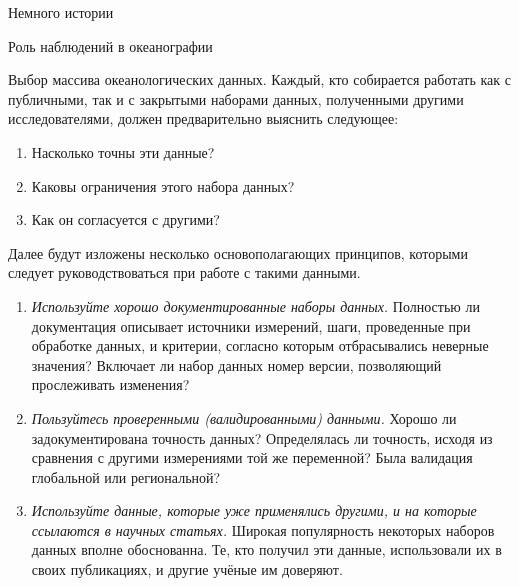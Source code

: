 \begin{chapter}{Немного истории}
\begin{section}{Роль наблюдений в океанографии}
\begin{paragraph}{Выбор массива океанологических данных.}
Каждый, кто собирается работать как с публичными, так и с закрытыми 
наборами данных, полученными другими исследователями, должен предварительно
выяснить следующее:
\begin{enumerate}
   \item Насколько точны эти данные?
   \item Каковы ограничения этого набора данных?
   \item Как он согласуется с другими?
\end{enumerate}
%

Далее будут изложены несколько основополагающих принципов, которыми следует
руководствоваться при работе с такими данными.
%

\begin{enumerate}
\item
\emph{Используйте хорошо документированные наборы данных.} Полностью ли
документация описывает источники измерений, шаги, проведенные при
обработке данных, и критерии, согласно которым отбрасывались неверные
значения? Включает ли набор данных номер версии, позволяющий 
прослеживать изменения?
%

\item
\emph{Пользуйтесь проверенными (валидированными) данными.} Хорошо ли
задокументирована точность данных? Определялась ли точность, исходя из
сравнения с другими измерениями той же переменной? Была валидация
глобальной или региональной?
%

\item
\emph{Используйте данные, которые уже применялись другими, и на которые
ссылаются в научных статьях.} Широкая популярность некоторых наборов данных 
вполне обоснованна. Те, кто получил эти данные, использовали их в 
своих публикациях, и другие учёные им доверяют.
%


\end{enumerate}
\end{paragraph}
\end{section}
\end{chapter}
